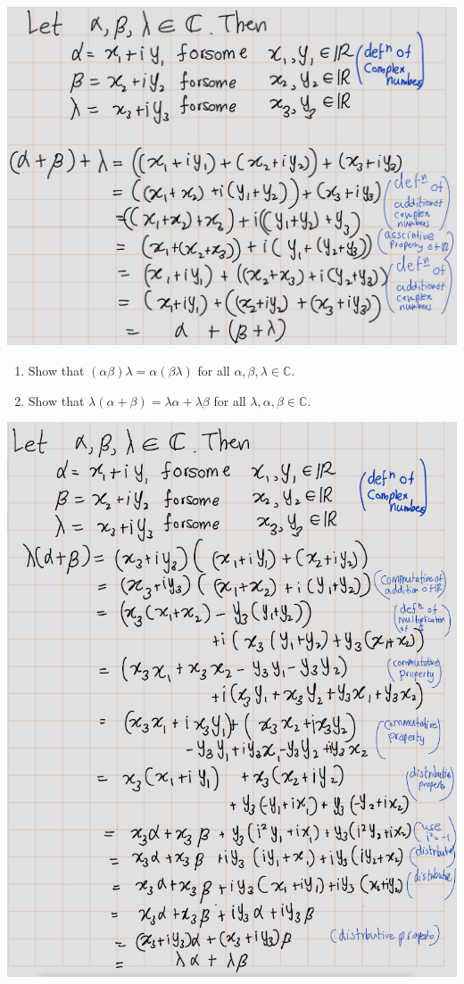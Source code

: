 \documentclass[
]{book}
\theoremstyle{definition}
\theoremstyle{definition}
\theoremstyle{definition}
\theoremstyle{definition}
\theoremstyle{remark}
\begin{document}
\includegraphics[width=14.89in]{fig/Ex1A/Ex2}

\begin{enumerate}
\def\labelenumi{\arabic{enumi}.}
\setcounter{enumi}{2}
\item
  Show that \((\alpha \beta)\lambda = \alpha(\beta \lambda)\) for all \(\alpha, \beta, \lambda \in \mathbb{C}\).
\item
  Show that \(\lambda(\alpha + \beta) = \lambda\alpha + \lambda\beta\) for all \(\lambda, \alpha, \beta \in \mathbb{C}\).
\end{enumerate}

\includegraphics[width=9.76in]{fig/Ex1A/Ex4}
\end{document}
